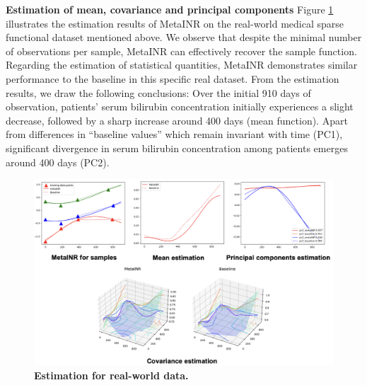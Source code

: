 \documentclass{article}
\begin{document}
\textbf{Estimation of mean, covariance and principal components}
Figure \ref{Estimation for real-world data} illustrates the estimation results of MetaINR on the real-world medical sparse functional dataset mentioned above. 
We observe that despite the minimal number of observations per sample, 
MetaINR can effectively recover the sample function. 
Regarding the estimation of statistical quantities, 
MetaINR demonstrates similar performance to the baseline in this specific real dataset.
From the estimation results, we draw the following conclusions: 
Over the initial 910 days of observation, patients' serum bilirubin concentration initially experiences a slight decrease, 
followed by a sharp increase around 400 days (mean function). 
Apart from differences in ``baseline values'' which remain invariant with time (PC1), 
significant divergence in serum bilirubin concentration among patients emerges around 400 days (PC2).
\begin{figure}[htb]
  \centering
  \includegraphics[width=\textwidth]{estimation_realData.png}
  \caption{\textbf{Estimation for real-world data.}}
  \label{Estimation for real-world data}
\end{figure}
\end{document}
